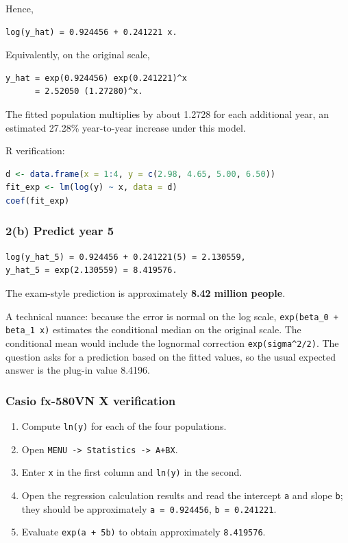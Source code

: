 ﻿\documentclass[11pt]{article}
\begin{document}
Hence,

\begin{lstlisting}
log(y_hat) = 0.924456 + 0.241221 x.
\end{lstlisting}

Equivalently, on the original scale,

\begin{lstlisting}
y_hat = exp(0.924456) exp(0.241221)^x
      = 2.52050 (1.27280)^x.
\end{lstlisting}

The fitted population multiplies by about 1.2728 for each additional year, an
estimated 27.28\% year-to-year increase under this model.

R verification:

\begin{lstlisting}[language=R]
d <- data.frame(x = 1:4, y = c(2.98, 4.65, 5.00, 6.50))
fit_exp <- lm(log(y) ~ x, data = d)
coef(fit_exp)
\end{lstlisting}

\subsubsection{2(b) Predict year 5}

\begin{lstlisting}
log(y_hat_5) = 0.924456 + 0.241221(5) = 2.130559,
y_hat_5 = exp(2.130559) = 8.419576.
\end{lstlisting}

The exam-style prediction is approximately \textbf{8.42 million people}.

A technical nuance: because the error is normal on the log scale,
\texttt{exp(beta\_0 + beta\_1 x)} estimates the conditional median on the original scale.
The conditional mean would include the lognormal correction
\texttt{exp(sigma\textasciicircum{}2/2)}. The question asks for a prediction based on the fitted values,
so the usual expected answer is the plug-in value 8.4196.

\subsubsection{Casio fx-580VN X verification}

\begin{enumerate}
\item Compute \texttt{ln(y)} for each of the four populations.
\item Open \texttt{MENU -> Statistics -> A+BX}.
\item Enter \texttt{x} in the first column and \texttt{ln(y)} in the second.
\item Open the regression calculation results and read the intercept \texttt{a} and slope
\texttt{b}; they should be approximately \texttt{a = 0.924456}, \texttt{b = 0.241221}.
\item Evaluate \texttt{exp(a + 5b)} to obtain approximately \texttt{8.419576}.
\end{enumerate}
\end{document}
